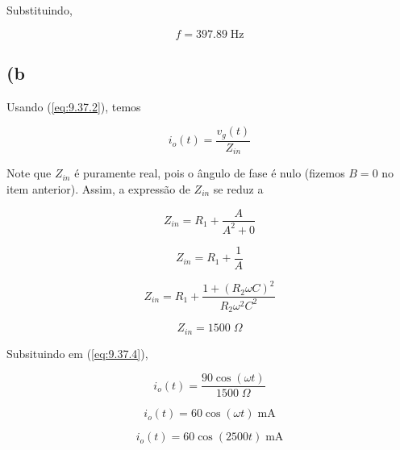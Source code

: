 Substituindo,

\[ \boxed{f = 397.89 \; \textrm{Hz}}  \]

\subsection*{(b}

Usando (\ref{eq:9.37.2}), temos

\begin{equation}\label{eq:9.37.4}
    i_o(t) = \frac{v_g(t)}{Z_{in}}
\end{equation}

Note que $Z_{in}$ é puramente real, pois o ângulo de fase é nulo (fizemos $B = 0$ no item anterior). Assim, a expressão de 
$Z_{in}$ se reduz a 

\[ Z_{in} = R_1 + \frac{A}{A^2 + 0} \]

\[ Z_{in} = R_1 + \frac{1}{A} \]

\[ Z_{in} = R_1 + \frac{1 + (R_2\omega C)^2}{R_2\omega^2C^2} \]

\[ Z_{in} = 1500 \; \Omega \]

Subsituindo em (\ref{eq:9.37.4}),

\[ i_o(t) = \frac{90\cos(\omega t)}{1500 \; \Omega} \]

\[ i_o(t) = 60\cos(\omega t) \; \textrm{mA} \]

\[ \boxed{i_o(t) = 60\cos(2500 t) \; \textrm{mA}}  \]












